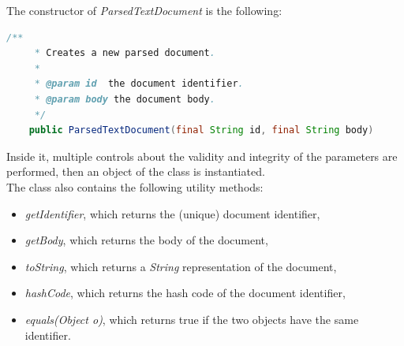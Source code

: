 \newpage
The constructor of \textit{ParsedTextDocument} is the following:
\begin{lstlisting}[language=Java]
    /**
     * Creates a new parsed document.
     *
     * @param id  the document identifier.
     * @param body the document body.
     */
    public ParsedTextDocument(final String id, final String body) 
\end{lstlisting}
Inside it, multiple controls about the validity and integrity of the parameters are performed, then an object of the class is instantiated. \\
The class also contains the following utility methods:
\begin{itemize}
\item \textit{getIdentifier}, which returns the (unique) document identifier,
\item \textit{getBody}, which returns the body of the document,
\item \textit{toString}, which returns a \textit{String} representation of the document,
\item \textit{hashCode}, which returns the hash code of the document identifier,
\item \textit{equals(Object o)}, which returns true if the two objects have the same identifier.
\end{itemize}



